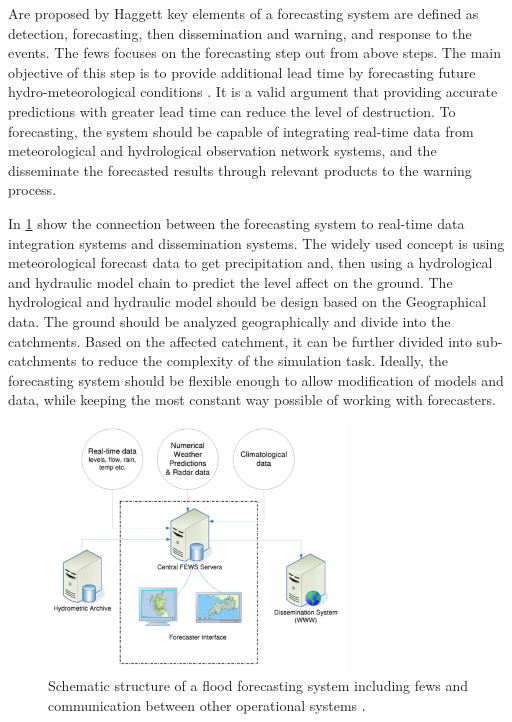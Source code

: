 Are proposed by Haggett \cite{Haggett1998AnWales} key elements of a forecasting system are defined as detection, forecasting, then dissemination and warning, and response to the events. The \acrshort{fews} focuses on the forecasting step out from above steps. The main objective of this step is to provide additional lead time by forecasting future hydro-meteorological conditions \cite{Werner2005FloodCatchments}. It is a valid argument that providing accurate predictions with greater lead time can reduce the level of destruction. To forecasting, the system should be capable of integrating real-time data from meteorological and hydrological observation network systems, and the disseminate the forecasted results through relevant products to the warning process.

In  \cref{fi:fews_schematic} show the connection between the forecasting system to real-time data integration systems and dissemination systems. The widely used concept is using meteorological forecast data to get precipitation and, then using a hydrological and hydraulic model chain to predict the level affect on the ground. The hydrological and hydraulic model should be design based on the Geographical data. The ground should be analyzed geographically and divide into the catchments. Based on the affected catchment, it can be further divided into sub-catchments to reduce the complexity of the simulation task. Ideally, the forecasting system should be flexible enough to allow modification of models and data, while keeping the most constant way possible of working with forecasters.

\begin{figure}[htp]
    \centering
    \includegraphics[width=0.7\textwidth]{lit/fews/Schematic-structure-of-a-fl-ood-forecasting-system-showing-the-position-of-Delft-FEWS_W640.png}
    \caption[Schematic structure of a flood forecasting system including \acrshort{fews} and communication between other operational systems]{Schematic structure of a flood forecasting system including \acrshort{fews} and communication between other operational systems \cite{Werner2013TheSystem}.}
    \label{fi:fews_schematic}
\end{figure}

